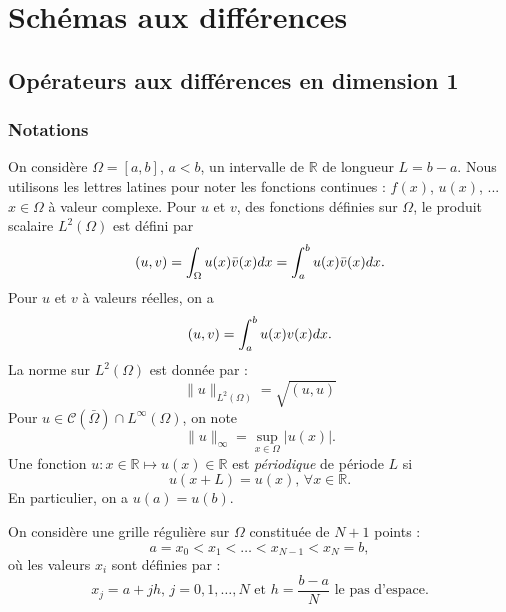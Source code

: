 \chapter{Schémas aux différences}

\section{Opérateurs aux différences en dimension 1}

\subsection{Notations}
\label{sec:notation_1D}

On considère $\Omega = [a,b]$, $a<b$, un intervalle de $\mathbb{R}$ de longueur $L=b-a$. Nous utilisons les lettres latines pour noter les fonctions continues : $f(x)$, $u(x)$, ... $x \in \Omega$ à valeur complexe. Pour $u$ et $v$, des fonctions définies sur $\Omega$, le produit scalaire $L^2 ( \Omega )$ est défini par
\begin{equation}
(u,v) = \displaystyle\int_{\Omega} u(x) \bar{v}(x) dx = \displaystyle\int_{a}^b u(x) \bar{v}(x) dx.
\end{equation}
Pour $u$ et $v$ à valeurs réelles, on a
\begin{equation}
(u,v) = \displaystyle\int_{a}^b u(x) v(x) dx.
\end{equation}
La norme sur $L^2(\Omega)$ est donnée par :
\begin{equation}
\| u \|_{L^2(\Omega)} = \sqrt{(u,u)}
\end{equation}
Pour $u \in \mathcal
C(\bar{\Omega}) \cap L^{\infty}(\Omega)$, on note
\begin{equation}
\| u \|_{\infty} = \sup_{x\in\Omega} |u(x)|.
\end{equation}
Une fonction $u : x \in \mathbb{R} \mapsto u(x) \in \mathbb{R}$ est \textit{périodique} de période $L$ si 
\begin{equation}
u(x+L) = u(x) \text{, } \forall x \in \mathbb{R}.
\end{equation}
En particulier, on a $u(a)=u(b)$.

On considère une grille régulière sur $\Omega$ constituée de $N + 1$ points :
\begin{equation}
a=x_0 < x_1 < \ldots < x_{N-1} < x_N = b,
\end{equation}
où les valeurs $x_i$ sont définies par :
\begin{equation}
x_j = a + j h\text{, } j = 0,1, \ldots,N \text{ et } h = \dfrac{b-a}{N} \text{ le pas d'espace}. 
\end{equation}

